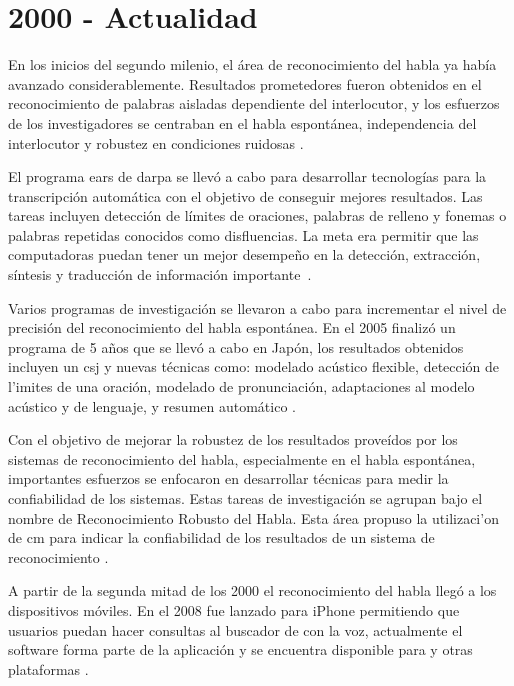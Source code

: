 \section{2000 - Actualidad}
\label{sec:post2000s}

En los inicios del segundo milenio, el \'{a}rea de reconocimiento del habla ya hab\'{i}a avanzado 
considerablemente. Resultados prometedores fueron obtenidos en el reconocimiento de palabras aisladas
dependiente del interlocutor, y los esfuerzos de los investigadores se centraban en el habla 
espont\'{a}nea, independencia del interlocutor y robustez en condiciones ruidosas \cite{RonzhinSurvey2006}.

El programa \gls{ears} de \gls{darpa} se llev\'{o} a cabo para desarrollar tecnolog\'{i}as para la
transcripci\'{o}n autom\'{a}tica con el objetivo de conseguir mejores resultados. 
Las tareas incluyen detecci\'{o}n de l\'{i}mites de oraciones, palabras de relleno 
y fonemas o palabras repetidas conocidos como disfluencias. 
La meta era permitir que las computadoras puedan tener un mejor desempe\~{n}o en la detecci\'{o}n, 
extracci\'{o}n, s\'{i}ntesis y traducci\'{o}n de informaci\'{o}n 
\mbox{importante \cite{LiuStructural2005, SoltauTheIBM2005}.}

Varios programas de investigaci\'{o}n se llevaron a cabo para incrementar el nivel de precisi\'{o}n del 
reconocimiento del habla espont\'{a}nea. En el 2005 finaliz\'{o} un programa de 5 a\~{n}os que se llev\'{o} a cabo en Jap\'{o}n, los resultados obtenidos incluyen un \gls{csj} 
y nuevas t\'{e}cnicas como: modelado ac\'{u}stico flexible, detecci\'{o}n de l'{i}mites de una oraci\'on,
modelado de pronunciaci\'{o}n, adaptaciones al modelo ac\'{u}stico y de lenguaje, 
y resumen autom\'{a}tico \cite{FuruiRecent2005}.

Con el objetivo de mejorar la robustez de los resultados prove\'{i}dos por los sistemas de reconocimiento
del habla, especialmente en el habla espont\'{a}nea, importantes esfuerzos se enfocaron en desarrollar 
t\'{e}cnicas para medir la confiabilidad de los sistemas. Estas tareas de investigaci\'{o}n se agrupan
bajo el nombre de Reconocimiento Robusto del Habla. Esta \'{a}rea propuso la utilizaci'{o}n 
de \gls{cm} para indicar la confiabilidad de los resultados de un sistema de 
reconocimiento \cite{JiangConfidence2005}.

A partir de la segunda mitad de los 2000 el reconocimiento del habla lleg\'{o} a los dispositivos 
m\'{o}viles. En el 2008 fue lanzado  para iPhone permitiendo que usuarios
puedan hacer consultas al buscador de  con la voz, actualmente el software forma parte de 
la aplicaci\'{o}n  y se encuentra disponible para  y otras 
plataformas \cite{GoogleSearch}.

